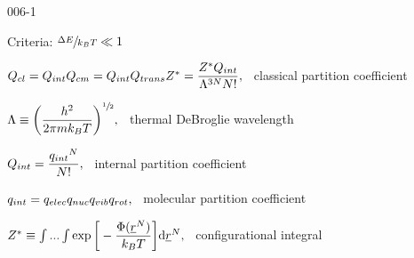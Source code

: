 \begin{mitframe}{006-1} %

    
\begin{listone}
    
    \item Criteria: $\sfrac{\iipf\energy}{\boltz\Temp} \ll 1$
    
    
    \item $ \cpc = \ipc\cmpc = \ipc \heatflow_{trans} \configint = \dfrac{\configint\ipc}{\debroglie^{3N}\nummoles!},$ ~classical partition coefficient 
    
    
    \begin{listtwo}
    
    	\item $\debroglie \equiv \bigg(\dfrac{\planck^2}{2\pie\mass\boltz\Temp}\bigg)^{\sfrac{1}{2}},$ ~thermal DeBroglie wavelength
        
  
    	\item $\ipc = \dfrac{{\impc}^{\nummoles}}{\nummoles!} ,$ ~internal partition coefficient
        
        \begin{listthree}
    
    		\item $\impc = \empc\nmpc\vmpc\rmpc ,$ ~molecular partition coefficient
    
    	\end{listthree}
    
    	\item $\configint \equiv \int...\int\exp\bigg[-\dfrac{\pot(\uline{\pos}^{\nummoles})}{\boltz\Temp}\bigg]\mathrm{d}\uline{\pos}^{\nummoles} ,$ ~configurational integral
    
    
    
    
    \end{listtwo}
    
\end{listone}
    
\end{mitframe}